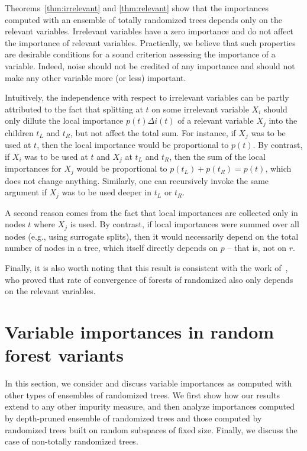 Theorems~\ref{thm:irrelevant} and \ref{thm:relevant} show that the
importances computed with an ensemble of totally randomized trees depends only
on the relevant variables. Irrelevant variables have a zero importance and do
not affect the importance of relevant variables. Practically, we believe that
such properties are desirable conditions for a sound criterion assessing the
importance of a variable. Indeed, noise should not be credited of any importance
and should not make any other variable more (or less) important.

Intuitively, the independence with respect to irrelevant variables can be partly
attributed to the fact that splitting at $t$ on some irrelevant variable $X_i$
should only dillute the local importance $p(t) \Delta i(t)$ of a relevant
variable $X_j$ into the children $t_L$ and $t_R$, but not affect the total sum.
For instance, if $X_j$ was to be used at $t$, then the local importance would be
proportional to $p(t)$. By contrast, if $X_i$ was to be used at $t$ and $X_j$ at
$t_L$ and $t_R$, then the sum of the local importances for $X_j$ would be
proportional to $p(t_L) + p(t_R)=p(t)$, which does not change anything.
Similarly, one can recursively invoke the same argument if $X_j$ was to be used
deeper in $t_L$ or $t_R$.

A second reason comes from the
fact that local importances are collected only in nodes $t$ where $X_j$ is used.
By contrast, if local importances were summed over all nodes (e.g., using
surrogate splits), then it would necessarily depend on the total number of nodes
in a tree, which itself directly depends on $p$ -- that is, not on $r$.

Finally, it is also worth noting that this result is consistent with the work
of~\citet{biau:2012}, who proved that rate of convergence of forests
of randomized also only depends on the relevant variables.


\section{Variable importances in random forest variants}
\label{sec:6:variants}

In this section, we consider and discuss variable importances as computed with
other types of ensembles of randomized trees. We first show how our results
extend to any other impurity measure, and then analyze importances computed by
depth-pruned ensemble of randomized trees and those computed by randomized
trees built on random subspaces of fixed size. Finally, we discuss the case of
non-totally randomized trees.

